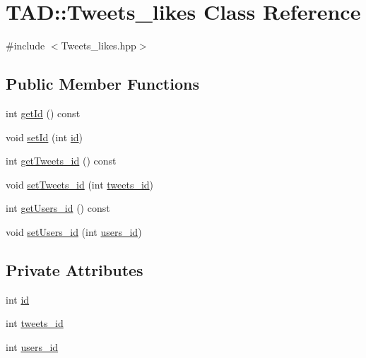 \hypertarget{class_t_a_d_1_1_tweets__likes}{}\section{T\+AD\+:\+:Tweets\+\_\+likes Class Reference}
\label{class_t_a_d_1_1_tweets__likes}


{\ttfamily \#include $<$Tweets\+\_\+likes.\+hpp$>$}

\subsection*{Public Member Functions}
\begin{DoxyCompactItemize}
\item 
int \hyperlink{class_t_a_d_1_1_tweets__likes_a62400f6e4edcd77561136027c6d4ca40}{get\+Id} () const
\item 
void \hyperlink{class_t_a_d_1_1_tweets__likes_af52472e24b98dca61b883c61a6877022}{set\+Id} (int \hyperlink{class_t_a_d_1_1_tweets__likes_ab1f2c80b000df7f4bfc0adef708a27a6}{id})
\item 
int \hyperlink{class_t_a_d_1_1_tweets__likes_a72aa8ea6e6615e264caffc51a3d5c0ac}{get\+Tweets\+\_\+id} () const
\item 
void \hyperlink{class_t_a_d_1_1_tweets__likes_a21e81ecf6f0c806157f8a81b7395a287}{set\+Tweets\+\_\+id} (int \hyperlink{class_t_a_d_1_1_tweets__likes_a615e93d8f213eeb53cdcf34d32cfdbfb}{tweets\+\_\+id})
\item 
int \hyperlink{class_t_a_d_1_1_tweets__likes_a8cfaca5cbccf695b172d65b2956a9936}{get\+Users\+\_\+id} () const
\item 
void \hyperlink{class_t_a_d_1_1_tweets__likes_aefdd8167428f5721f700674c8d6b6df1}{set\+Users\+\_\+id} (int \hyperlink{class_t_a_d_1_1_tweets__likes_a0dae8c00350e0a150ba729aa12e01c87}{users\+\_\+id})
\end{DoxyCompactItemize}
\subsection*{Private Attributes}
\begin{DoxyCompactItemize}
\item 
int \hyperlink{class_t_a_d_1_1_tweets__likes_ab1f2c80b000df7f4bfc0adef708a27a6}{id}
\item 
int \hyperlink{class_t_a_d_1_1_tweets__likes_a615e93d8f213eeb53cdcf34d32cfdbfb}{tweets\+\_\+id}
\item 
int \hyperlink{class_t_a_d_1_1_tweets__likes_a0dae8c00350e0a150ba729aa12e01c87}{users\+\_\+id}
\end{DoxyCompactItemize}


